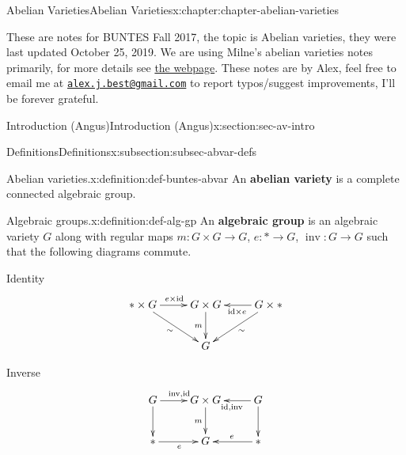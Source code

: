 \documentclass[oneside,10pt,]{book}
\newcommand{\terminology}[1]{\textbf{#1}}
\numberwithin{equation}{section}
\newcommand{\id}{\mathrm{id}}
\begin{document}
\begin{chapterptx}{Abelian Varieties}{}{Abelian Varieties}{}{}{x:chapter:chapter-abelian-varieties}
\begin{introduction}{}%
These are notes for BUNTES Fall 2017, the topic is Abelian varieties, they were last updated October 25, 2019. We are using Milne's abelian varieties notes primarily, for more details see \href{http://math.bu.edu/people/angusmca/buntes/fall2017.html}{the webpage}. These notes are by Alex, feel free to email me at \href{mailto:alex.j.best@gmail.com}{\nolinkurl{alex.j.best@gmail.com}} to report typos\slash{}suggest improvements, I'll be forever grateful.%
\end{introduction}%
%
%
\typeout{************************************************}
\typeout{************************************************}
%
\begin{sectionptx}{Introduction (Angus)}{}{Introduction (Angus)}{}{}{x:section:sec-av-intro}
%
%
\typeout{************************************************}
\typeout{************************************************}
%
\begin{subsectionptx}{Definitions}{}{Definitions}{}{}{x:subsection:subsec-abvar-defs}
\begin{definition}{Abelian varieties.}{x:definition:def-buntes-abvar}%
An \terminology{abelian variety} is a complete connected algebraic group.%
\end{definition}
\begin{definition}{Algebraic groups.}{x:definition:def-alg-gp}%
An \terminology{algebraic group} is an algebraic variety \(G\) along with regular maps \(m\colon G\times G\to G\), \(e \colon * \to G\),  \(\operatorname{inv}\colon G\to G\) such that the following diagrams commute.%
\par
Identity%
\begin{equation*}
\xymatrix{
\ast\times G\ar[dr]_{\sim}\ar[r]^{e\times \id} & G\times G\ar[d]_m &G\times \ast\ar[l]^{\id\times e}\ar[dl]^\sim\\
& G &
}
\end{equation*}
%
\par
Inverse%
\begin{equation*}
\xymatrix{
G\ar[d]\ar[r]^{\operatorname{inv}, \id} & G\times G\ar[d]_m &G\ar[l]^{\id, \operatorname{inv}}\ar[d]\\
\ast\ar[r]_e& G &\ast\ar[l]_e
}
\end{equation*}
%
\par

\end{definition}
\end{subsectionptx}
\end{sectionptx}
\end{chapterptx}
\end{document}
